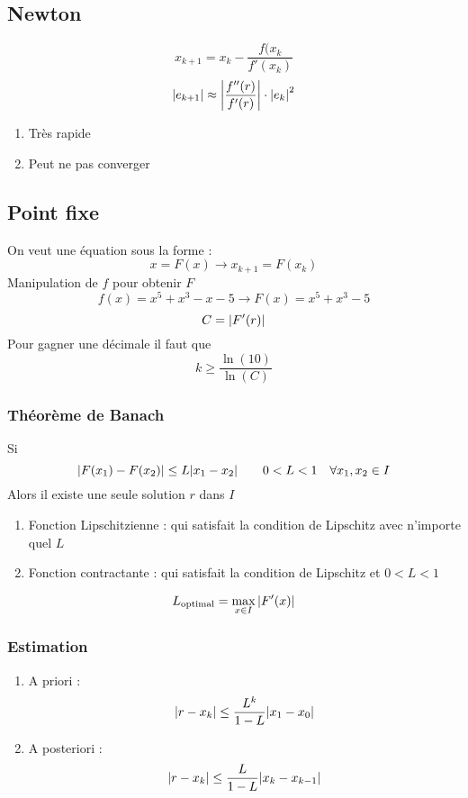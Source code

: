 \documentclass[resume]{subfiles}
\begin{document}
\subsection{Newton}
$$\boxed{x_{k+1}=x_{k}-\frac{f(x_{k}}{f'(x_{k})}}$$
$$\abs{e_{k+1}}\approx \abs{\frac{f''(r)}{f'(r)}}\cdot \abs{e_k}^2$$
\begin{enumerate}
\item Très rapide
\item Peut ne pas converger
\end{enumerate}
\subsection{Point fixe} 
On veut une équation sous la forme :
$$\boxed{x=F(x)\longrightarrow x_{k+1}=F(x_{k})}$$
Manipulation de $f$ pour obtenir $F$
$$f(x)=x^5+x^3-x-5\longrightarrow F(x)=x^5+x^3-5$$
$$C=\abs{F'(r)}$$
Pour gagner une décimale il faut que
$$k\geq \frac{\ln(10)}{\ln(C)}$$
\subsubsection{Théorème de Banach}
Si 
$$\abs{F(x_1)-F(x_2)}\leq L\abs{x_1-x_2}\qquad 0<L<1\quad \forall x_1,x_2\in I$$
Alors il existe une seule solution $r$ dans $I$
\begin{enumerate}
\item Fonction Lipschitzienne : qui satisfait la condition de Lipschitz avec n'importe quel $L$
\item Fonction contractante : qui satisfait la condition de Lipschitz et $0<L<1$
\end{enumerate}
$$L_\text{optimal}=\max_{x\in I}\abs{F'(x)}$$
\subsubsection{Estimation}
\begin{enumerate}
\item A priori : 
$$\abs{r-x_k}\leq \frac{L^{k}}{1-L}\abs{x_1-x_0}$$
\item A posteriori :
$$\abs{r-x_k}\leq \frac{L}{1-L}\abs{x_k-x_{k-1}}$$
\end{enumerate}




	


    
\end{document}
